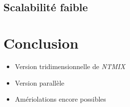 \documentclass{beamer}
\begin{document}
\subsection{Scalabilité faible}
\begin{frame}
  
\end{frame}

%
%
\section{Conclusion}
\begin{frame}
  \begin{itemize}
  \item Version tridimensionnelle de \textit{NTMIX}
  \item Version parallèle
  \item Amériolations encore possibles
  \end{itemize}

\end{frame}
\end{document}
